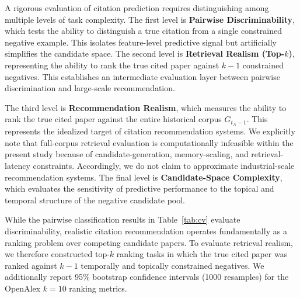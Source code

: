 \documentclass[11pt,a4paper]{article}
\begin{document}
A rigorous evaluation of citation prediction requires distinguishing among multiple levels of task complexity. The first level is \textbf{Pairwise Discriminability}, which tests the ability to distinguish a true citation from a single constrained negative example. This isolates feature-level predictive signal but artificially simplifies the candidate space. The second level is \textbf{Retrieval Realism (Top-\(k\))}, representing the ability to rank the true cited paper against \(k-1\) constrained negatives. This establishes an intermediate evaluation layer between pairwise discrimination and large-scale recommendation. 

The third level is \textbf{Recommendation Realism}, which measures the ability to rank the true cited paper against the entire historical corpus \(G_{t_A-1}\). This represents the idealized target of citation recommendation systems. We explicitly note that full-corpus retrieval evaluation is computationally infeasible within the present study because of candidate-generation, memory-scaling, and retrieval-latency constraints. Accordingly, we do not claim to approximate industrial-scale recommendation systems. The final level is \textbf{Candidate-Space Complexity}, which evaluates the sensitivity of predictive performance to the topical and temporal structure of the negative candidate pool.

While the pairwise classification results in Table~\ref{tab:cv} evaluate discriminability, realistic citation recommendation operates fundamentally as a ranking problem over competing candidate papers. To evaluate retrieval realism, we therefore constructed top-\(k\) ranking tasks in which the true cited paper was ranked against \(k-1\) temporally and topically constrained negatives. We additionally report 95\% bootstrap confidence intervals (1000 resamples) for the OpenAlex \(k=10\) ranking metrics.
\end{document}
